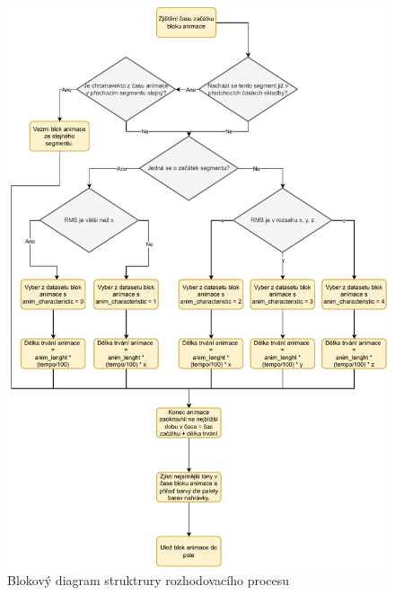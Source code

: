 \begin{figure}[H]
    \centering
    \includegraphics[width = 1\linewidth]{obrazky/Logical_structure_diagram.pdf}
    \caption{Blokový diagram struktrury rozhodovacího procesu}
    \label{fig:Logical_structure_diagram}
\end{figure}



